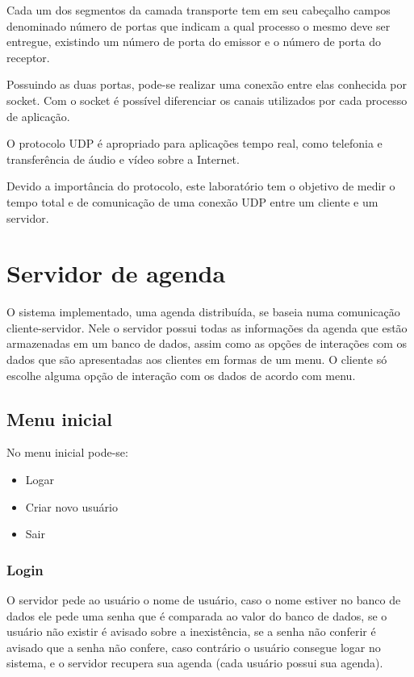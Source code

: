 \documentclass[10pt,a4paper]{article}
\begin{document}
Cada um dos segmentos da camada transporte tem em seu cabeçalho campos
denominado número de portas que indicam a qual processo o mesmo deve
ser entregue, existindo um número de porta do emissor e o número de porta do
receptor. 

Possuindo as duas portas, pode-se realizar uma conexão entre elas
conhecida por socket. Com o socket é possível diferenciar os canais
utilizados por cada processo de aplicação.

O protocolo UDP é apropriado para aplicações
tempo real, como telefonia e transferência de áudio e
vídeo sobre a Internet.

Devido a importância do protocolo, este laboratório tem o objetivo de
medir o tempo total e de comunicação de uma conexão UDP entre um
cliente e um servidor.

\section{Servidor de agenda}
O sistema implementado, uma agenda distribuída, se baseia numa comunicação
cliente-servidor. Nele o servidor possui todas as informações da
agenda que estão armazenadas em um banco de dados,
assim como as opções de interações com os dados que são apresentadas
aos clientes em formas de um menu.
O cliente só escolhe alguma opção de interação com os dados de
acordo com menu.


\subsection{Menu inicial}
No menu inicial pode-se:

\begin{itemize}
\item Logar
\item Criar novo usuário
\item Sair
\end{itemize}

\subsubsection{Login}
O servidor pede ao usuário o nome de usuário, caso o nome estiver no
banco de dados ele pede uma senha que é comparada ao valor do banco de
dados, se o usuário não existir é avisado sobre a inexistência, se a
senha não conferir é avisado que a senha não confere, caso contrário o
usuário consegue logar no sistema, e o servidor recupera sua agenda (cada
usuário possui sua agenda).
\end{document}

